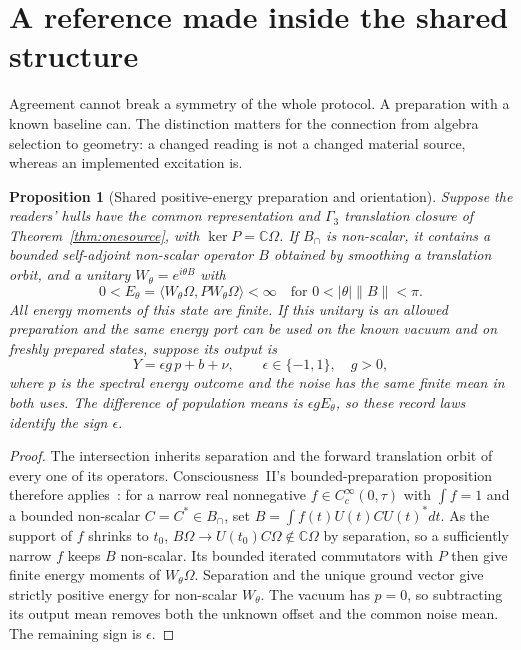 \documentclass[12pt]{article}
\newtheorem{proposition}[theorem]{Proposition}
\theoremstyle{definition}
\theoremstyle{remark}
\begin{document}
\section{A reference made inside the shared structure}\label{sec:sharedsource}

Agreement cannot break a symmetry of the whole protocol. A preparation with a
known baseline can. The distinction matters for the connection from algebra
selection to geometry: a changed reading is not a changed material source,
whereas an implemented excitation is.

\begin{proposition}[Shared positive-energy preparation and orientation]
\label{prop:sharedreference}
Suppose the readers' hulls have the common representation and $\Gamma_3$
translation closure of Theorem~\ref{thm:onesource}, with
$\ker P=\mathbb C\Omega$. If $B_\cap$ is non-scalar, it contains a bounded
self-adjoint non-scalar operator $B$ obtained by smoothing a translation orbit,
and a unitary $W_\theta=e^{i\theta B}$ with
\[
 0<E_\theta=\langle W_\theta\Omega,PW_\theta\Omega\rangle<\infty
 \quad\text{for }0<|\theta|\|B\|<\pi.
\]
All energy moments of this state are finite. If this unitary is an allowed
preparation and the same energy port can be used on the known vacuum and on
freshly prepared states, suppose its output is
\[
 Y=\epsilon g\,p+b+\nu,\qquad \epsilon\in\{-1,1\},\quad g>0,
\]
where $p$ is the spectral energy outcome and the noise has the same finite
mean in both uses. The difference of population means is
$\epsilon gE_\theta$, so these record laws identify the sign $\epsilon$.
\end{proposition}
\begin{proof}
The intersection inherits separation and the forward translation orbit of
every one of its operators. Consciousness~II's bounded-preparation proposition
therefore applies~\cite[section on a bounded accessible preparation]{PaperII}:
for a narrow real nonnegative $f\in C_c^\infty(0,\tau)$ with $\int f=1$ and
a bounded non-scalar $C=C^*\in B_\cap$, set
$B=\int f(t)U(t)CU(t)^*dt$. As the support of $f$ shrinks to $t_0$,
$B\Omega\to U(t_0)C\Omega\notin\mathbb C\Omega$ by separation,
so a sufficiently narrow $f$ keeps $B$ non-scalar. Its bounded iterated
commutators with $P$ then give
finite energy moments of $W_\theta\Omega$. Separation and the unique ground
vector give strictly positive energy for non-scalar $W_\theta$.
The vacuum has $p=0$, so subtracting its output mean removes both the unknown
offset and the common noise mean. The remaining sign is $\epsilon$.
\end{proof}
\end{document}
